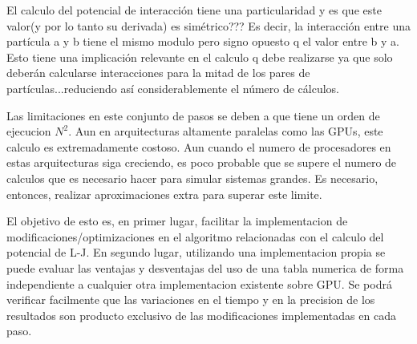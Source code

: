 El calculo del potencial de interacción tiene una particularidad y es que este valor(y por lo tanto su derivada) es simétrico??? Es decir, la interacción entre una partícula a y b tiene el mismo modulo pero signo opuesto q el valor entre b y a. Esto tiene una implicación relevante en el calculo q debe realizarse ya que solo deberán calcularse interacciones para la mitad de los pares de partículas...reduciendo así considerablemente el número de cálculos.



Las limitaciones en este conjunto de pasos se deben a que tiene un orden de ejecucion $N^2$. Aun en arquitecturas altamente paralelas como las GPUs, este calculo es extremadamente costoso. 
Aun cuando el numero de procesadores en estas arquitecturas siga creciendo, es poco probable que se supere el numero de calculos que es necesario hacer para simular sistemas grandes.
Es necesario, entonces, realizar aproximaciones extra para superar este limite.




El objetivo de esto es, en primer lugar, facilitar la implementacion de modificaciones/optimizaciones en el algoritmo relacionadas con el calculo del potencial de L-J.
En segundo lugar, utilizando una implementacion propia se puede evaluar las ventajas y desventajas del uso de una tabla numerica de forma independiente a cualquier otra implementacion existente sobre GPU. 
Se podrá verificar facilmente que las variaciones en el tiempo y en la precision de los resultados son producto exclusivo de las modificaciones implementadas en cada paso.







